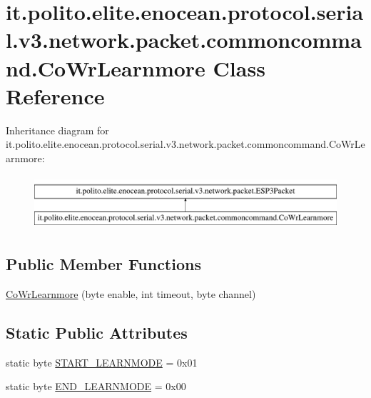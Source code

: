 \hypertarget{classit_1_1polito_1_1elite_1_1enocean_1_1protocol_1_1serial_1_1v3_1_1network_1_1packet_1_1commoncommand_1_1_co_wr_learnmore}{}\section{it.\+polito.\+elite.\+enocean.\+protocol.\+serial.\+v3.\+network.\+packet.\+commoncommand.\+Co\+Wr\+Learnmore Class Reference}
\label{classit_1_1polito_1_1elite_1_1enocean_1_1protocol_1_1serial_1_1v3_1_1network_1_1packet_1_1commoncommand_1_1_co_wr_learnmore}
Inheritance diagram for it.\+polito.\+elite.\+enocean.\+protocol.\+serial.\+v3.\+network.\+packet.\+commoncommand.\+Co\+Wr\+Learnmore\+:\begin{figure}[H]
\begin{center}
\leavevmode
\includegraphics[height=2.000000cm]{classit_1_1polito_1_1elite_1_1enocean_1_1protocol_1_1serial_1_1v3_1_1network_1_1packet_1_1commoncommand_1_1_co_wr_learnmore}
\end{center}
\end{figure}
\subsection*{Public Member Functions}
\begin{DoxyCompactItemize}
\item 
\hyperlink{classit_1_1polito_1_1elite_1_1enocean_1_1protocol_1_1serial_1_1v3_1_1network_1_1packet_1_1commoncommand_1_1_co_wr_learnmore_aedd6c1a1c97e1bc383a8a1bd8e80a96f}{Co\+Wr\+Learnmore} (byte enable, int timeout, byte channel)
\end{DoxyCompactItemize}
\subsection*{Static Public Attributes}
\begin{DoxyCompactItemize}
\item 
static byte \hyperlink{classit_1_1polito_1_1elite_1_1enocean_1_1protocol_1_1serial_1_1v3_1_1network_1_1packet_1_1commoncommand_1_1_co_wr_learnmore_aca0454b7422f28b67f6695e1b6ba6540}{S\+T\+A\+R\+T\+\_\+\+L\+E\+A\+R\+N\+M\+O\+DE} = 0x01
\item 
static byte \hyperlink{classit_1_1polito_1_1elite_1_1enocean_1_1protocol_1_1serial_1_1v3_1_1network_1_1packet_1_1commoncommand_1_1_co_wr_learnmore_a679444884117a520c5a88b28233cb384}{E\+N\+D\+\_\+\+L\+E\+A\+R\+N\+M\+O\+DE} = 0x00
\end{DoxyCompactItemize}
